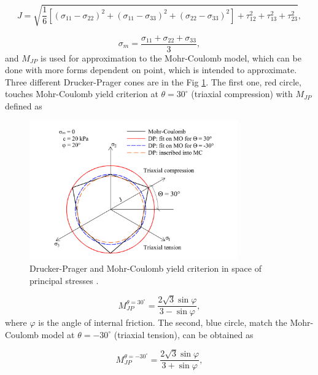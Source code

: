 \begin{equation}\label{eq:f_J_sigM}
	J = \sqrt{\dfrac{1}{6} \left[(\sigma_{11}-\sigma_{22})^{2} + (\sigma_{11}-\sigma_{33})^{2} + (\sigma_{22}-\sigma_{33})^{2}\right] + \tau_{12}^{2} + \tau_{13}^{2}+ \tau_{23}^{2}},
\end{equation}


\begin{equation}\label{eq:f_sigM}
	\sigma_m = \dfrac{\sigma_{11} + \sigma_{22} + \sigma_{33}}{3},
\end{equation}
and $M_{JP}$ is used for approximation to the Mohr-Coulomb model, which can be done with more forms dependent on point, which is intended to approximate. Three different Drucker-Prager cones are in the Fig \ref{obr:F1}. The first one, red circle, touches Mohr-Coulomb yield criterion at $\theta = 30^\circ$ (triaxial compression) with $M_{JP}$ defined as

\begin{figure}[h!]
	\centering	
	\includegraphics[width=0.8\textwidth, angle=0]{obrazky/drucker-prager_eng.png}
	\caption[Drucker-Prager a Mohr-Coulomb model $T$]{Drucker-Prager and Mohr-Coulomb yield criterion in space of principal stresses \cite{geofem}. \label{obr:F1}}
\end{figure}



\begin{equation}\label{eq:f_Mjp_30}
	M_{JP}^{\theta=30^\circ} = \dfrac{2\sqrt{3}\sin\varphi}{3-\sin \varphi},
\end{equation}
where $\varphi$ is the angle of internal friction. The second, blue circle, match the Mohr-Coulomb model at  $\theta = -30^\circ$ (triaxial tension), can be obtained as

\begin{equation}\label{eq:f_Mjp_-30}
	M_{JP}^{\theta=-30^\circ} = \dfrac{2\sqrt{3}\sin\varphi}{3+\sin \varphi},
\end{equation}

